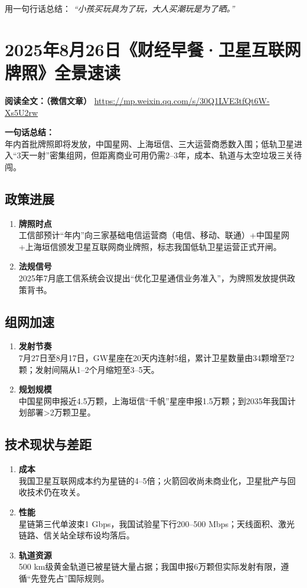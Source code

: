 用一句行话总结：  
\emph{“小孩买玩具为了玩，大人买潮玩是为了晒。”}


\section{2025年8月26日《财经早餐·卫星互联网牌照》全景速读}
\vspace{1cm}
\noindent\textbf{阅读全文：（微信文章）} \url{
https://mp.weixin.qq.com/s/30Q1LVE3tfQt6W-Xs5U2rw}

\textbf{一句话总结：}  \\
年内首批牌照即将发放，中国星网、上海垣信、三大运营商悉数入围；低轨卫星进入“3天一射”密集组网，但距离商业可用仍需2–3年，成本、轨道与太空垃圾三关待闯。

\subsection{政策进展}
\begin{enumerate}[leftmargin=*, nosep]
    \item \textbf{牌照时点}  \\
    工信部预计“年内”向三家基础电信运营商（电信、移动、联通）+中国星网+上海垣信颁发卫星互联网商业牌照，标志我国低轨卫星运营正式开闸。
    \item \textbf{法规信号}  \\
    2025年7月底工信系统会议提出“优化卫星通信业务准入”，为牌照发放提供政策背书。
\end{enumerate}

\subsection{组网加速}
\begin{enumerate}[leftmargin=*, nosep]
    \item \textbf{发射节奏}  \\
    7月27日至8月17日，GW星座在20天内连射5组，累计卫星数量由34颗增至72颗；发射间隔从1–2个月缩短至3–5天。
    \item \textbf{规划规模}  \\
    中国星网申报近4.5万颗，上海垣信“千帆”星座申报1.5万颗；到2035年我国计划部署>2万颗卫星。
\end{enumerate}

\subsection{技术现状与差距}
\begin{enumerate}[leftmargin=*, nosep]
    \item \textbf{成本}  \\
    我国卫星互联网成本约为星链的4–5倍；火箭回收尚未商业化，卫星批产与回收技术仍在攻关。
    \item \textbf{性能}  \\
    星链第三代单波束1 Gbps，我国试验星下行200–500 Mbps；天线面积、激光链路、信关站全球布设均落后。
    \item \textbf{轨道资源}  \\
    500 km级黄金轨道已被星链大量占据；我国申报6万颗但实际发射有限，遵循“先登先占”国际规则。
\end{enumerate}

